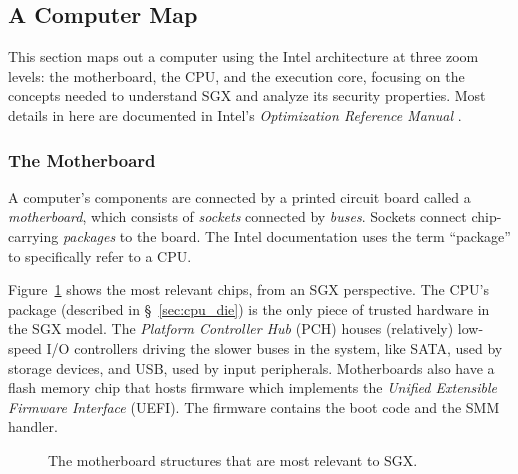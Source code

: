 \subsection{A Computer Map}

This section maps out a computer using the Intel architecture at three zoom
levels: the motherboard, the CPU, and the execution core, focusing on the
concepts needed to understand SGX and analyze its security properties. Most
details in here are documented in Intel's
\textit{Optimization Reference Manual} \cite{intel2014optimization}.


\subsubsection{The Motherboard}
\label{sec:motherboard}

A computer's components are connected by a printed circuit board called a
\textit{motherboard}, which consists of \textit{sockets} connected by
\textit{buses}. Sockets connect chip-carrying \textit{packages} to the board.
The Intel documentation uses the term ``package'' to specifically refer to a
CPU.

Figure~\ref{fig:motherboard} shows the most relevant chips, from an SGX
perspective. The CPU's package (described in \S~\ref{sec:cpu_die}) is the only
piece of trusted hardware in the SGX model. The \textit{Platform Controller
Hub} (PCH) houses (relatively) low-speed I/O controllers driving the slower
buses in the system, like SATA, used by storage devices, and USB, used by
input peripherals. Motherboards also have a flash memory chip that hosts
firmware which implements the \textit{Unified Extensible Firmware Interface}
(UEFI). The firmware contains the boot code and the SMM handler.

\begin{figure}[hbt]
  \caption{
    The motherboard structures that are most relevant to SGX.
  }
  \label{fig:motherboard}
\end{figure}

